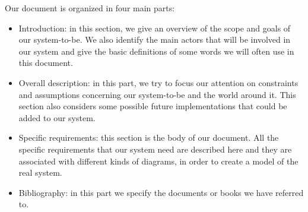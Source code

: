 Our document is organized in four main parts:
\begin{itemize}
	\item Introduction: in this section, we give an overview of the scope and goals of our system-to-be. We also identify the main actors that will be involved in our system and give the basic definitions of some words we will often use in this document.
	\item Overall description: in this part, we try to focus our attention on constraints and assumptions concerning our system-to-be and the world around it. This section also considers some possible future implementations that could be added to our system.
	\item Specific requirements: this section is the body of our document. All the specific requirements that our system need are described here and they are associated with different kinds of diagrams, in order to create a model of the real system.
	\item Bibliography: in this part we specify the documents or books we have referred to.
	
\end{itemize}